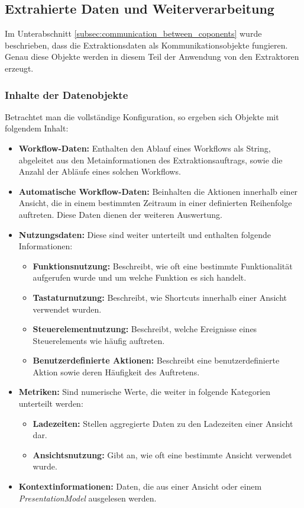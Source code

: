 \subsection{Extrahierte Daten und Weiterverarbeitung}
\label{subsec:extraction_data_and_converting}
Im Unterabschnitt \ref{subsec:communication_between_coponents} wurde beschrieben, dass die Extraktionsdaten als Kommunikationsobjekte fungieren. Genau diese Objekte werden in diesem Teil der Anwendung von den Extraktoren erzeugt. 

\subsubsection{Inhalte der Datenobjekte}
Betrachtet man die vollständige Konfiguration, so ergeben sich Objekte mit folgendem Inhalt:

\begin{itemize}
    \item \textbf{Workflow-Daten:} Enthalten den Ablauf eines Workflows als String, abgeleitet aus den Metainformationen des Extraktionsauftrags, sowie die Anzahl der Abläufe eines solchen Workflows.
    
    \item \textbf{Automatische Workflow-Daten:} Beinhalten die Aktionen innerhalb einer Ansicht, die in einem bestimmten Zeitraum in einer definierten Reihenfolge auftreten. Diese Daten dienen der weiteren Auswertung.
    
    \item \textbf{Nutzungsdaten:} Diese sind weiter unterteilt und enthalten folgende Informationen:
    \begin{itemize}
        \item \textbf{Funktionsnutzung:} Beschreibt, wie oft eine bestimmte Funktionalität aufgerufen wurde und um welche Funktion es sich handelt.
        \item \textbf{Tastaturnutzung:} Beschreibt, wie Shortcuts innerhalb einer Ansicht verwendet wurden.
        \item \textbf{Steuerelementnutzung:} Beschreibt, welche Ereignisse eines Steuerelements wie häufig auftreten.
        \item \textbf{Benutzerdefinierte Aktionen:} Beschreibt eine benutzerdefinierte Aktion sowie deren Häufigkeit des Auftretens.
    \end{itemize}
    
    \item \textbf{Metriken:} Sind numerische Werte, die weiter in folgende Kategorien unterteilt werden:
    \begin{itemize}
        \item \textbf{Ladezeiten:} Stellen aggregierte Daten zu den Ladezeiten einer Ansicht dar.
        \item \textbf{Ansichtsnutzung:} Gibt an, wie oft eine bestimmte Ansicht verwendet wurde.
    \end{itemize}
    
    \item \textbf{Kontextinformationen:} Daten, die aus einer Ansicht oder einem \textit{PresentationModel} ausgelesen werden.
\end{itemize}

